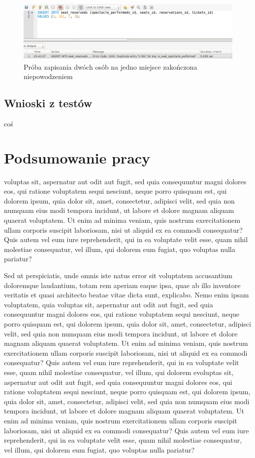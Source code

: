 \documentclass{mgr}
\begin{document}
\begin{figure}[!ht]
	\centering
	\includegraphics[width=\textwidth]{images/app_db_insert_fail.png}
	\caption{Próba zapisania dwóch osób na jedno miejsce zakończona niepowodzeniem}
	\label{fig:app_db_insert_fail}
\end{figure}

\section{Wnioski z testów}
coś

\chapter{Podsumowanie pracy}
voluptas sit, aspernatur aut odit aut fugit, sed quia consequuntur magni dolores eos, qui ratione voluptatem sequi nesciunt, neque porro quisquam est, qui dolorem ipsum, quia dolor sit, amet, consectetur, adipisci velit, sed quia non numquam eius modi tempora incidunt, ut labore et dolore magnam aliquam quaerat voluptatem. Ut enim ad minima veniam, quis nostrum exercitationem ullam corporis suscipit laboriosam, nisi ut aliquid ex ea commodi consequatur? Quis autem vel eum iure reprehenderit, qui in ea voluptate velit esse, quam nihil molestiae consequatur, vel illum, qui dolorem eum fugiat, quo voluptas nulla pariatur?

Sed ut perspiciatis, unde omnis iste natus error sit voluptatem accusantium doloremque laudantium, totam rem aperiam eaque ipsa, quae ab illo inventore veritatis et quasi architecto beatae vitae dicta sunt, explicabo. Nemo enim ipsam voluptatem, quia voluptas sit, aspernatur aut odit aut fugit, sed quia consequuntur magni dolores eos, qui ratione voluptatem sequi nesciunt, neque porro quisquam est, qui dolorem ipsum, quia dolor sit, amet, consectetur, adipisci velit, sed quia non numquam eius modi tempora incidunt, ut labore et dolore magnam aliquam quaerat voluptatem. Ut enim ad minima veniam, quis nostrum exercitationem ullam corporis suscipit laboriosam, nisi ut aliquid ex ea commodi consequatur? Quis autem vel eum iure reprehenderit, qui in ea voluptate velit esse, quam nihil molestiae consequatur, vel illum, qui dolorem evoluptas sit, aspernatur aut odit aut fugit, sed quia consequuntur magni dolores eos, qui ratione voluptatem sequi nesciunt, neque porro quisquam est, qui dolorem ipsum, quia dolor sit, amet, consectetur, adipisci velit, sed quia non numquam eius modi tempora incidunt, ut labore et dolore magnam aliquam quaerat voluptatem. Ut enim ad minima veniam, quis nostrum exercitationem ullam corporis suscipit laboriosam, nisi ut aliquid ex ea commodi consequatur? Quis autem vel eum iure reprehenderit, qui in ea voluptate velit esse, quam nihil molestiae consequatur, vel illum, qui dolorem eum fugiat, quo voluptas nulla pariatur?
\end{document}
